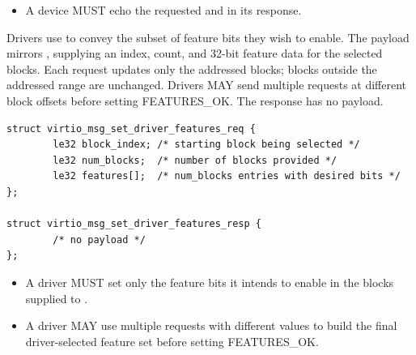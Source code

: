 \begin{itemize}
  \item A device MUST echo the requested  and
         in its response.
\end{itemize}


Drivers use  to convey the subset of feature
bits they wish to enable. The payload mirrors ,
supplying an index, count, and 32-bit feature data for the selected blocks.
Each  request updates only the addressed blocks;
blocks outside the addressed range are unchanged. Drivers MAY send multiple
 requests at different block offsets before setting
FEATURES\_OK. The response has no payload.

\begin{lstlisting}
struct virtio_msg_set_driver_features_req {
        le32 block_index; /* starting block being selected */
        le32 num_blocks;  /* number of blocks provided */
        le32 features[];  /* num_blocks entries with desired bits */
};

struct virtio_msg_set_driver_features_resp {
        /* no payload */
};
\end{lstlisting}

\begin{itemize}
  \item A driver MUST set only the feature bits it intends to enable in the
        blocks supplied to .
  \item A driver MAY use multiple  requests with
        different  values to build the final driver-selected
        feature set before setting FEATURES\_OK.
\end{itemize}

